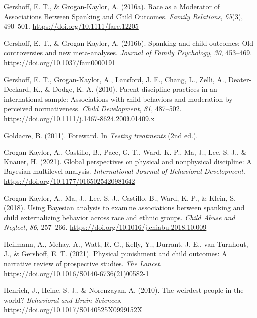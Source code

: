 \documentclass[
  letterpaper,
  DIV=11,
  numbers=noendperiod]{scrreprt}
\newlength{\cslhangindent}
\newlength{\cslentryspacingunit} %
\newenvironment{CSLReferences}[2] %
 {%
  \setlength{\parindent}{0pt}
  \ifodd #1
  \let\oldpar\par
  \def\par{\hangindent=\cslhangindent\oldpar}
  \fi
  \setlength{\parskip}{#2\cslentryspacingunit}
 }%
 {}
\begin{document}
\begin{CSLReferences}{1}{0}
\leavevmode{}%
Gershoff, E. T., \& Grogan-Kaylor, A. (2016a). {Race as a Moderator of
Associations Between Spanking and Child Outcomes}. \emph{Family
Relations}, \emph{65}(3), 490--501.
\url{https://doi.org/10.1111/fare.12205}

\leavevmode{}%
Gershoff, E. T., \& Grogan-Kaylor, A. (2016b). Spanking and child
outcomes: Old controversies and new meta-analyses. \emph{Journal of
Family Psychology}, \emph{30}, 453--469.
\url{https://doi.org/10.1037/fam0000191}

\leavevmode{}%
Gershoff, E. T., Grogan-Kaylor, A., Lansford, J. E., Chang, L., Zelli,
A., Deater-Deckard, K., \& Dodge, K. A. (2010). Parent discipline
practices in an international sample: Associations with child behaviors
and moderation by perceived normativeness. \emph{Child Development},
\emph{81}, 487--502.
\url{https://doi.org/10.1111/j.1467-8624.2009.01409.x}

\leavevmode{}%
Goldacre, B. (2011). {Foreward}. In \emph{Testing treatments} (2nd ed.).

\leavevmode{}%
Grogan-Kaylor, A., Castillo, B., Pace, G. T., Ward, K. P., Ma, J., Lee,
S. J., \& Knauer, H. (2021). {Global perspectives on physical and
nonphysical discipline: A {B}ayesian multilevel analysis}.
\emph{International Journal of Behavioral Development}.
\url{https://doi.org/10.1177/0165025420981642}

\leavevmode{}%
Grogan-Kaylor, A., Ma, J., Lee, S. J., Castillo, B., Ward, K. P., \&
Klein, S. (2018). Using {B}ayesian analysis to examine associations
between spanking and child externalizing behavior across race and ethnic
groups. \emph{Child Abuse and Neglect}, \emph{86}, 257--266.
\url{https://doi.org/10.1016/j.chiabu.2018.10.009}

\leavevmode{}%
Heilmann, A., Mehay, A., Watt, R. G., Kelly, Y., Durrant, J. E., van
Turnhout, J., \& Gershoff, E. T. (2021). Physical punishment and child
outcomes: A narrative review of prospective studies. \emph{The Lancet}.
\url{https://doi.org/10.1016/S0140-6736(21)00582-1}

\leavevmode{}%
Henrich, J., Heine, S. J., \& Norenzayan, A. (2010). {The weirdest
people in the world?} \emph{Behavioral and Brain Sciences}.
\url{https://doi.org/10.1017/S0140525X0999152X}


\end{CSLReferences}
\end{document}

